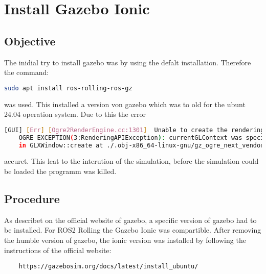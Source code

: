 \section{Install Gazebo Ionic}

\subsection{Objective}
The inidial try to install gazebo was by using the defalt installation. Therefore the command:
\begin{lstlisting}[language=bash]
    sudo apt install ros-rolling-ros-gz 
\end{lstlisting}

was used. This installed a version von gazebo which was to old for the ubunt 24.04 operation system. 
Due to this the error
\begin{lstlisting}[language=bash]
    [GUI] [Err] [Ogre2RenderEngine.cc:1301]  Unable to create the rendering window: 
    OGRE EXCEPTION(3:RenderingAPIException): currentGLContext was specified with no current GL context 
    in GLXWindow::create at ./.obj-x86_64-linux-gnu/gz_ogre_next_vendor-prefix/src/gz_ogre_next_vendor/RenderSystems/GL3Plus/src/windowing/GLX/OgreGLXWindow.cpp (line 165)
\end{lstlisting}
    

accuret. This leat to the interution of the simulation, before the simulation could be loaded the programm was killed. 

\subsection{Procedure}
As describet on the official website of gazebo, a specific version of gazebo had to be installed. For ROS2 Rolling the Gazebo Ionic was compartible. 
After removing the humble version of gazebo, the ionic version was installed by following the instructions of the official website: 

\begin{lstlisting}
    https://gazebosim.org/docs/latest/install_ubuntu/
\end{lstlisting}
